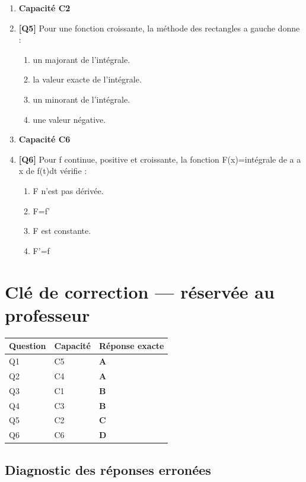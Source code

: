 \begin{enumerate}
\item[] \textbf{Capacité C2}

\item \textbf{[Q5]} Pour une fonction croissante, la méthode des rectangles a gauche donne :
  \begin{enumerate}[label=\Alph*.]
    \item un majorant de l'intégrale.
    \item la valeur exacte de l'intégrale.
    \item un minorant de l'intégrale.
    \item une valeur négative.
  \end{enumerate}

\item[] \textbf{Capacité C6}

\item \textbf{[Q6]} Pour f continue, positive et croissante, la fonction F(x)=intégrale de a a x de f(t)dt vérifie :
  \begin{enumerate}[label=\Alph*.]
    \item F n'est pas dérivée.
    \item F=f'
    \item F est constante.
    \item F'=f
  \end{enumerate}

\end{enumerate}

\ifnxVersionProfesseur
\clearpage
\section*{Clé de correction — réservée au professeur}

\begin{center}
\begin{tabular}{lll}
\hline
Question & Capacité & Réponse exacte \\
\hline
Q1 & C5 & \textbf{A} \\
Q2 & C4 & \textbf{A} \\
Q3 & C1 & \textbf{B} \\
Q4 & C3 & \textbf{B} \\
Q5 & C2 & \textbf{C} \\
Q6 & C6 & \textbf{D} \\
\hline
\end{tabular}
\end{center}

\subsection*{Diagnostic des réponses erronées}

